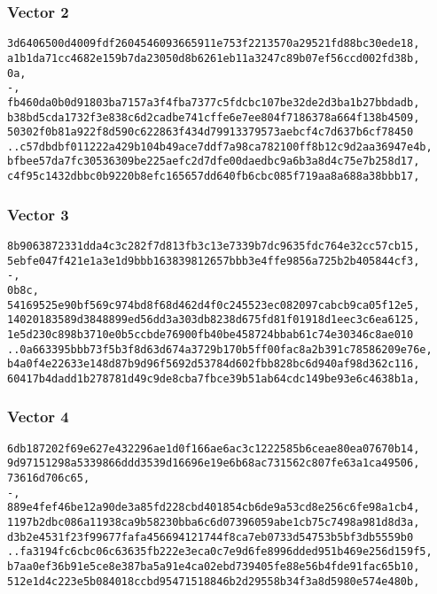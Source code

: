 \documentclass[
]{article}
\begin{document}
\hypertarget{vector-2}{%
\subsubsection{Vector 2}\label{vector-2}}

\begin{verbatim}
3d6406500d4009fdf2604546093665911e753f2213570a29521fd88bc30ede18,
a1b1da71cc4682e159b7da23050d8b6261eb11a3247c89b07ef56ccd002fd38b,
0a,
-,
fb460da0b0d91803ba7157a3f4fba7377c5fdcbc107be32de2d3ba1b27bbdadb,
b38bd5cda1732f3e838c6d2cadbe741cffe6e7ee804f7186378a664f138b4509,
50302f0b81a922f8d590c622863f434d79913379573aebcf4c7d637b6cf78450
..c57dbdbf011222a429b104b49ace7ddf7a98ca782100ff8b12c9d2aa36947e4b,
bfbee57da7fc30536309be225aefc2d7dfe00daedbc9a6b3a8d4c75e7b258d17,
c4f95c1432dbbc0b9220b8efc165657dd640fb6cbc085f719aa8a688a38bbb17,
\end{verbatim}

\hypertarget{vector-3}{%
\subsubsection{Vector 3}\label{vector-3}}

\begin{verbatim}
8b9063872331dda4c3c282f7d813fb3c13e7339b7dc9635fdc764e32cc57cb15,
5ebfe047f421e1a3e1d9bbb163839812657bbb3e4ffe9856a725b2b405844cf3,
-,
0b8c,
54169525e90bf569c974bd8f68d462d4f0c245523ec082097cabcb9ca05f12e5,
14020183589d3848899ed56dd3a303db8238d675fd81f01918d1eec3c6ea6125,
1e5d230c898b3710e0b5ccbde76900fb40be458724bbab61c74e30346c8ae010
..0a663395bbb73f5b3f8d63d674a3729b170b5ff00fac8a2b391c78586209e76e,
b4a0f4e22633e148d87b9d96f5692d53784d602fbb828bc6d940af98d362c116,
60417b4dadd1b278781d49c9de8cba7fbce39b51ab64cdc149be93e6c4638b1a,
\end{verbatim}

\hypertarget{vector-4}{%
\subsubsection{Vector 4}\label{vector-4}}

\begin{verbatim}
6db187202f69e627e432296ae1d0f166ae6ac3c1222585b6ceae80ea07670b14,
9d97151298a5339866ddd3539d16696e19e6b68ac731562c807fe63a1ca49506,
73616d706c65,
-,
889e4fef46be12a90de3a85fd228cbd401854cb6de9a53cd8e256c6fe98a1cb4,
1197b2dbc086a11938ca9b58230bba6c6d07396059abe1cb75c7498a981d8d3a,
d3b2e4531f23f99677fafa456694121744f8ca7eb0733d54753b5bf3db5559b0
..fa3194fc6cbc06c63635fb222e3eca0c7e9d6fe8996dded951b469e256d159f5,
b7aa0ef36b91e5ce8e387ba5a91e4ca02ebd739405fe88e56b4fde91fac65b10,
512e1d4c223e5b084018ccbd95471518846b2d29558b34f3a8d5980e574e480b,
\end{verbatim}
\end{document}
